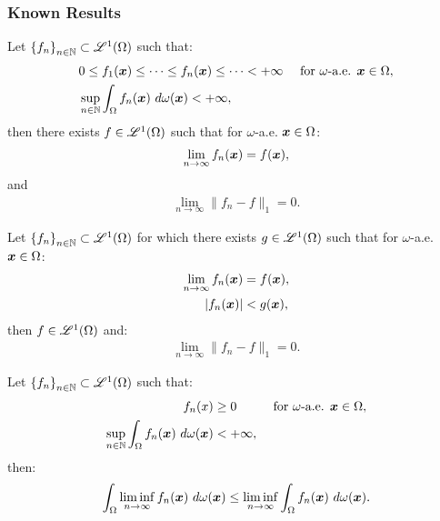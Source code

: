 \subsubsection{Known Results}

\begin{theorem}
    Let $\left\{ f_n \right\}_{n \in \mathbb{N}} \subset \mathscr{L}^{1}(\Omega)$ such that:
    \begin{align}
        & 0 \leq f_1(\bm{x}) \leq \dots \leq f_n(\bm{x}) \leq \dots < +\infty &\text{ for } \omega \text{-a.e. } \bm{x} \in \Omega, \\
        & \sup_{n \in \mathbb{N}} \int_\Omega f_n(\bm{x}) ~ d \omega(\bm{x}) < +\infty,
    \end{align}
    then there exists $f \in \mathscr{L}^{1}(\Omega)$ such that for $\omega$-a.e. $\bm{x} \in \Omega$:
    \begin{align}
        \lim_{n \rightarrow \infty} f_n(\bm{x}) = f(\bm{x}),
    \end{align}
    and
    \begin{align}
        \lim_{n \rightarrow \infty} \lVert f_n - f \rVert_1 = 0.
    \end{align}
\end{theorem}

\begin{theorem}
    Let $\left\{ f_n \right\}_{n \in \mathbb{N}} \subset \mathscr{L}^{1}(\Omega)$ for which there exists $g \in \mathscr{L}^{1}(\Omega)$ such that for $\omega$-a.e. $\bm{x} \in \Omega$:
    \begin{align}
        \lim_{n \rightarrow \infty} f_n(\bm{x}) & = f(\bm{x}), \\
        \lvert f_n(\bm{x}) \rvert & < g(\bm{x}),
    \end{align}
    then $f \in \mathscr{L}^{1}(\Omega)$ and:
    \begin{align}
        \lim_{n \rightarrow \infty} \lVert f_n - f \rVert_1 = 0.
    \end{align}
\end{theorem}

\begin{lemma}[Fatou]
    Let $\left\{ f_n \right\}_{n \in \mathbb{N}} \subset \mathscr{L}^{1}(\Omega)$ such that:
    \begin{align}
        f_n(x) & \geq 0 &\text{ for } \omega \text{-a.e. } \bm{x} \in \Omega, \\
        \sup_{n \in \mathbb{N}} \int_{\Omega} f_n(\bm{x}) ~ d \omega(\bm{x}) & < +\infty,
    \end{align}
    then:
    \begin{align}
        \int_{\Omega} \liminf_{n \rightarrow \infty} f_n(\bm{x}) ~ d \omega(\bm{x}) \leq \liminf_{n \rightarrow \infty} \int_{\Omega} f_n(\bm{x}) ~ d \omega(\bm{x}).
    \end{align}
\end{lemma}

